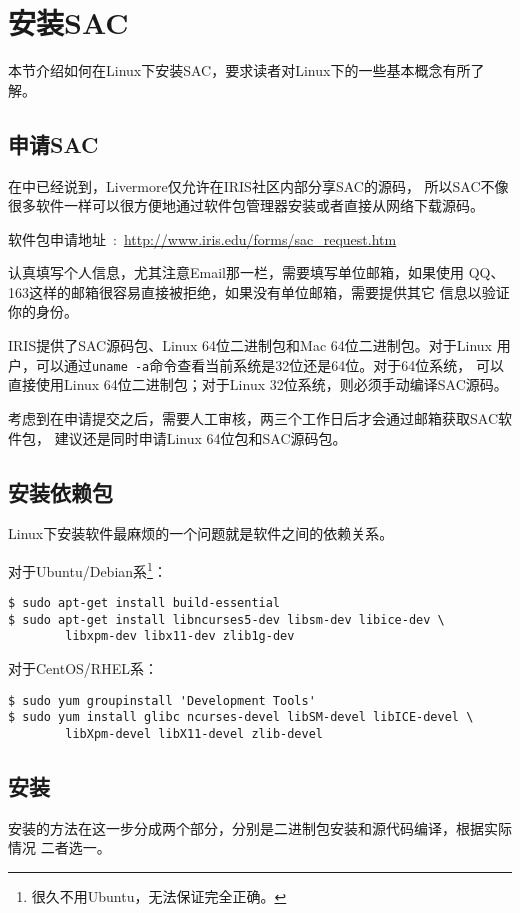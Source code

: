 \section{安装SAC}
本节介绍如何在Linux下安装SAC，要求读者对Linux下的一些基本概念有所了解。

\subsection*{申请SAC}
在中已经说到，Livermore仅允许在IRIS社区内部分享SAC的源码，
所以SAC不像很多软件一样可以很方便地通过软件包管理器安装或者直接从网络下载源码。

软件包申请地址~:~\url{http://www.iris.edu/forms/sac\_request.htm}

认真填写个人信息，尤其注意Email那一栏，需要填写单位邮箱，如果使用
QQ、163这样的邮箱很容易直接被拒绝，如果没有单位邮箱，需要提供其它
信息以验证你的身份。

IRIS提供了SAC源码包、Linux 64位二进制包和Mac 64位二进制包。对于Linux
用户，可以通过\lstinline{uname -a}命令查看当前系统是32位还是64位。对于64位系统，
可以直接使用Linux 64位二进制包；对于Linux 32位系统，则必须手动编译SAC源码。

考虑到在申请提交之后，需要人工审核，两三个工作日后才会通过邮箱获取SAC软件包，
建议还是同时申请Linux 64位包和SAC源码包。

\subsection*{安装依赖包}
Linux下安装软件最麻烦的一个问题就是软件之间的依赖关系。

对于Ubuntu/Debian系\footnote{很久不用Ubuntu，无法保证完全正确。}：
\begin{lstlisting}[style=Shell]
$ sudo apt-get install build-essential
$ sudo apt-get install libncurses5-dev libsm-dev libice-dev \
        libxpm-dev libx11-dev zlib1g-dev
\end{lstlisting}

对于CentOS/RHEL系：
\begin{lstlisting}[style=Shell]
$ sudo yum groupinstall 'Development Tools'
$ sudo yum install glibc ncurses-devel libSM-devel libICE-devel \
        libXpm-devel libX11-devel zlib-devel 
\end{lstlisting}

\subsection*{安装}
安装的方法在这一步分成两个部分，分别是二进制包安装和源代码编译，根据实际情况
二者选一。
